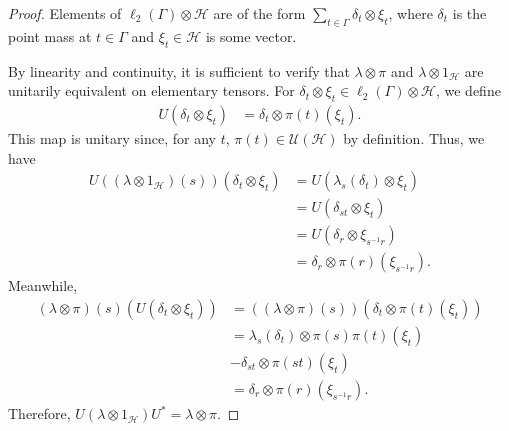 \begin{proof}
  Elements of $\ell_2\left( \Gamma \right)\otimes \mathcal{H}$ are of the form $\sum_{t\in\Gamma}\delta_t\otimes \xi_{t}$, where $\delta_t$ is the point mass at $t\in\Gamma$ and $\xi_{t}\in \mathcal{H}$ is some vector.\newline

  By linearity and continuity, it is sufficient to verify that $\lambda\otimes \pi$ and $\lambda\otimes 1_{\mathcal{H}}$ are unitarily equivalent on elementary tensors. For $\delta_t\otimes \xi_t\in \ell_2\left( \Gamma \right)\otimes \mathcal{H}$, we define
  \begin{align*}
    U\left( \delta_t\otimes \xi_t \right) &= \delta_t\otimes \pi(t)\left(\xi_t\right).
  \end{align*}
  This map is unitary since, for any $t$, $\pi(t)\in \mathcal{U}\left( \mathcal{H} \right)$ by definition. Thus, we have
  \begin{align*}
    U\left( \left( \lambda\otimes 1_{\mathcal{H}} \right)(s) \right)\left( \delta_t\otimes \xi_t \right) &= U\left( \lambda_s\left(\delta_t\right)\otimes \xi_t \right)\\
                                                                                                         &= U\left( \delta_{st}\otimes \xi_t \right)\\
                                                                                                         &= U\left( \delta_{r}\otimes \xi_{s^{-1}r} \right)\\
                                                                                                         &= \delta_{r}\otimes \pi(r)\left( \xi_{s^{-1}r} \right).
  \end{align*}
  Meanwhile,
  \begin{align*}
    \left( \lambda\otimes \pi \right)(s)\left( U\left( \delta_t\otimes \xi_t \right) \right) &= \left( \left( \lambda\otimes \pi \right)(s) \right)\left( \delta_t\otimes \pi(t)\left( \xi_t \right) \right)\\
                                                                                             &= \lambda_s\left( \delta_t \right)\otimes \pi(s)\pi(t)\left( \xi_t \right)\\
                                                                                             &- \delta_{st}\otimes \pi\left( st \right)\left( \xi_{t} \right)\\
                                                                                             &= \delta_{r}\otimes \pi\left( r \right)\left( \xi_{s^{-1}r} \right).
  \end{align*}
  Therefore, $U\left( \lambda\otimes 1_{\mathcal{H}} \right)U^{\ast} = \lambda\otimes \pi $.
\end{proof}
